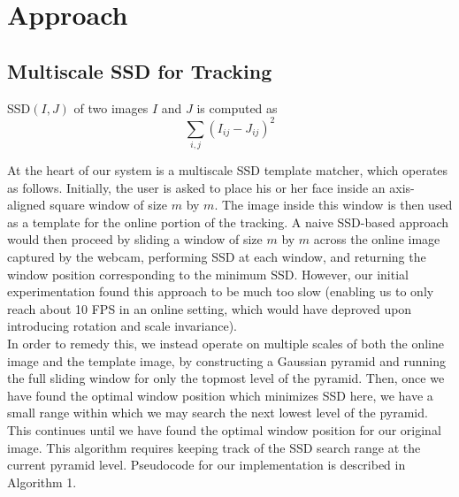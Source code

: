 \documentclass[10pt,twocolumn,letterpaper]{article}
\begin{document}
\section{Approach}

\subsection*{Multiscale SSD for Tracking}
SSD$(I, J)$ of two images $I$ and $J$ is computed as
$$\displaystyle\sum_{i, j}(I_{ij} - J_{ij})^{2}$$

At the heart of our system is a multiscale SSD template matcher, which operates as follows.
Initially, the user is asked to place his or her face inside an axis-aligned square window of size
$m$ by $m$. The image inside this window is then used as a template for the online
portion of the tracking. A naive SSD-based approach would then proceed by sliding a window of
size $m$ by $m$ across the online image captured by the webcam, performing SSD at each window,
and returning the window position corresponding to the minimum SSD. However, our initial
experimentation found this approach to be much too slow (enabling us to only reach about 10 FPS
in an online setting, which would have deproved upon introducing rotation and scale invariance).\\

In order to remedy this, we instead operate on multiple scales of both the online image and the
template image, by constructing a Gaussian pyramid and running the full sliding window for only
the topmost level of the pyramid. Then, once we have found the optimal window position which
minimizes SSD here, we have a small range within which we may search the next lowest level of
the pyramid. This continues until we have found the optimal window position for our original image.
This algorithm requires keeping track of the SSD search range at the current pyramid level.
Pseudocode for our implementation is described in Algorithm 1.\\
\end{document}
